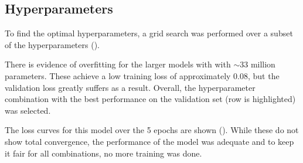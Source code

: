 \subsection{Hyperparameters}\label{mlS22}

To find the optimal hyperparameters, a grid search was performed over a subset
of the hyperparameters (). 

There is evidence of overfitting for the larger models with with $\sim\!33$
million parameters. These achieve a low training loss of approximately 0.08,
but the validation loss greatly suffers as a result. Overall, the
hyperparameter combination with the best performance on the validation set (row
is highlighted) was selected.

The loss curves for this model over the 5 epochs are shown ().
While these do not show total convergence, the performance of the model was
adequate and to keep it fair for all combinations, no more training was done.

